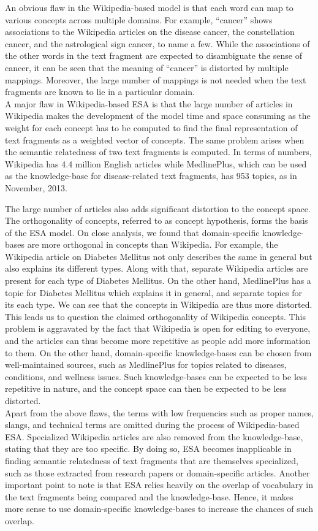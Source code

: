 \documentclass[conference]{IEEEtran}
\begin{document}
An obvious flaw in the Wikipedia-based model is that each word can map to various concepts across multiple domains. For example, ``cancer'' shows associations to the Wikipedia articles on the disease cancer, the constellation cancer, and the astrological sign cancer, to name a few. While the associations of the other words in the text fragment are expected to disambiguate the sense of cancer, it can be seen that the meaning of ``cancer'' is distorted by multiple mappings. Moreover, the large number of mappings is not needed when the text fragments are known to lie in a particular domain.\\
A major flaw in Wikipedia-based ESA is that the large number of articles in Wikipedia makes the development of the model time and space consuming as the weight for each concept has to be computed to find the final representation of text fragments as a weighted vector of concepts. The same problem arises when the semantic relatedness of two text fragments is computed. In terms of numbers, Wikipedia has 4.4 million English articles while MedlinePlus, which can be used as the knowledge-base for disease-related text fragments, has 953 topics, as in November, 2013.

The large number of articles also adds significant distortion to the concept space. The orthogonality of concepts, referred to as concept hypothesis, forms the basis of the ESA model. On close analysis, we found that domain-specific knowledge-bases are more orthogonal in concepts than Wikipedia. For example, the Wikipedia article on Diabetes Mellitus not only describes the same in general but also explains its different types. Along with that, separate Wikipedia articles are present for each type of Diabetes Mellitus. On the other hand, MedlinePlus has a topic for Diabetes Mellitus which explains it in general, and separate topics for its each type. We can see that the concepts in Wikipedia are thus more distorted. This leads us to question the claimed orthogonality of Wikipedia concepts. This problem is aggravated by the fact that Wikipedia is open for editing to everyone, and the articles can thus become more repetitive as people add more information to them. On the other hand, domain-specific knowledge-bases can be chosen from well-maintained sources, such as MedlinePlus for topics related to diseases, conditions, and wellness issues. Such knowledge-bases can be expected to be less repetitive in nature, and the concept space can then be expected to be less distorted.\\
Apart from the above flaws, the terms with low frequencies such as proper names, slangs, and technical terms are omitted during the process of Wikipedia-based ESA. Specialized Wikipedia articles are also removed from the knowledge-base, stating that they are too specific. By doing so, ESA becomes inapplicable in finding semantic relatedness of text fragments that are themselves specialized, such as those extracted from research papers or domain-specific articles. Another important point to note is that ESA relies heavily on the overlap of vocabulary in the text fragments being compared and the knowledge-base. Hence, it makes more sense to use domain-specific knowledge-bases to increase the chances of such overlap.
\end{document}
